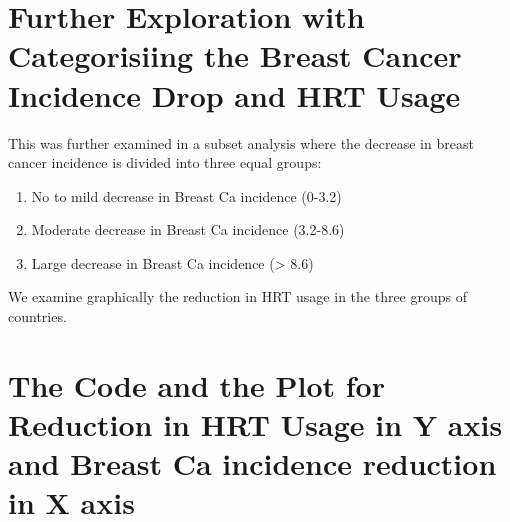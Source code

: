 \documentclass{article}
\begin{document}
\section*{Further Exploration with Categorisiing the Breast Cancer Incidence Drop and HRT Usage}

This was further examined in a subset analysis where the decrease in breast cancer incidence is divided into three equal groups: 

\begin{enumerate}
\item No to mild decrease in Breast Ca incidence (0-3.2)
\item Moderate decrease in Breast Ca incidence (3.2-8.6)
\item Large decrease in Breast Ca incidence (> 8.6)

\end{enumerate}


We examine graphically the reduction in HRT usage in the three groups of countries. 

\section*{The Code and the Plot for Reduction in HRT Usage in Y axis and Breast Ca incidence reduction in X axis}
\end{document}
